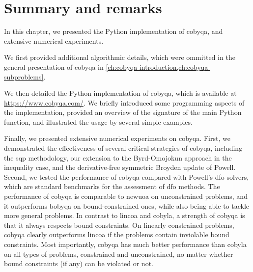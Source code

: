 
\section{Summary and remarks}

In this chapter, we presented the Python implementation of \gls{cobyqa}, and extensive numerical experiments.

We first provided additional algorithmic details, which were ommitted in the general presentation of \gls{cobyqa} in \cref{ch:cobyqa-introduction,ch:cobyqa-subproblems}.

We then detailed the Python implementation of \gls{cobyqa}, which is available at \url{https://www.cobyqa.com/}.
We briefly introduced some programming aspects of the implementation, provided an overview of the signature of the main Python function, and illustrated the usage by several simple examples.

Finally, we presented extensive numerical experiments on \gls{cobyqa}.
First, we demonstrated the effectiveness of several critical strategies of \gls{cobyqa}, including the \gls{sqp} methodology, our extension to the Byrd-Omojokun approach in the inequality case, and the derivative-free symmetric Broyden update of Powell.
Second, we tested the performance of \gls{cobyqa} compared with Powell's \gls{dfo} solvers, which are standard benchmarks for the assessment of \gls{dfo} methods.
The performance of \gls{cobyqa} is comparable to \gls{newuoa} on unconstrained problems, and it outperforms \gls{bobyqa} on bound-constrained ones, while also being able to tackle more general problems.
In contrast to \gls{lincoa} and \gls{cobyla}, a strength of \gls{cobyqa} is that it always respects bound constraints.
On linearly constrained problems, \gls{cobyqa} clearly outperforms \gls{lincoa} if the problems contain inviolable bound constraints.
Most importantly, \gls{cobyqa} has much better performance than \gls{cobyla} on all types of problems, constrained and unconstrained, no matter whether bound constraints (if any) can be violated or not.

